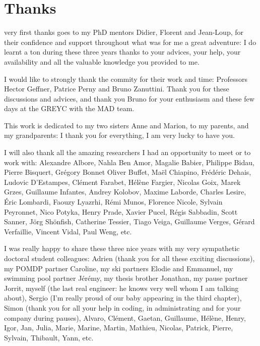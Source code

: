 \chapter*{Thanks}
\vspace{-2cm}
 very first thanks goes to my PhD mentors Didier, Florent and Jean-Loup,
for their confidence and support throughout what was for me a great adventure:
I do learnt a ton during these three years thanks to your advices, your help, 
your availability and all the valuable knowledge you provided to me.

I would like to strongly thank the commity for their work and time: 
Professors Hector Geffner, Patrice Perny and Bruno Zanuttini.
Thank you for these discussions and advices, 
and thank you Bruno for your enthusiasm 
and these few days at the GREYC with the MAD team.

This work is dedicated to my two sisters Anne and Marion, to my parents, and my grandparents: 
I thank you for everything, I am very lucky to have you.

I will also thank all the amazing researchers 
I had an opportunity to meet or to work with:
Alexandre Albore,
Nahla Ben Amor,
Magalie Babier,
Philippe Bidau, 
Pierre Bisquert,
Gr\'egory Bonnet
Oliver Buffet,
Ma\"el Chiapino,
Fr\'ed\'eric Dehais,
Ludovic D'Estampes,
Cl\'ement Farabet,
H\'el\`ene Fargier, 
Nicolas Goix,
Marek Grzes, 
Guillaume Infantes,
Andrey Kolobov,
Maxime Laborde,
Charles Lesire,
\'Eric Lombardi,
Faouzy Lyazrhi,
R\'emi Munos,
Florence Nicole,
Sylvain Peyronnet,
Nico Potyka,
Henry Prade,
Xavier Pucel,
R\'egis Sabbadin, 
Scott Sanner,
J\"org Sh\"onfish,
Catherine Tessier,
Tiago Veiga,
Guillaume Verges,
G\'erard Verfaillie,
Vincent Vidal,
Paul Weng, etc.






I was really happy to share these three nice years with
my very sympathetic doctoral student colleagues: 
Adrien (thank you for all these exciting discussions), 
my POMDP partner Caroline,
my ski partners Elodie and Emmanuel,
my swimming pool partner J\'er\'emy, 
my thesis brother Jonathan, 
my pause partner Jorrit, 
myself (the last real engineer: he knows very well whom I am talking about), 
Sergio (I'm really proud of our baby appearing in the third chapter),  
Simon (thank you for all your help in coding, in administrating and for your company during pauses), 
Alvaro, Cl\'ement, Gaetan, Guillaume, H\'el\`ene, Henry, Igor, Jan, Julia, Marie, Marine, Martin, Mathieu, Nicolas, Patrick, Pierre, Sylvain, Thibault, Yann, etc.

